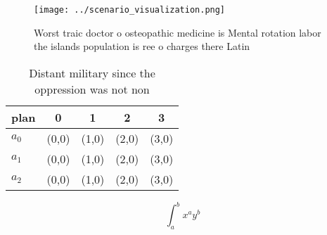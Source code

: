 \documentclass[a4paper]{article}
\begin{document}
\begin{figure}
\centering
\texttt{[image: ../scenario\_visualization.png]}
\caption{Worst traic doctor o osteopathic medicine is Mental rotation labor the islands population is ree o charges there Latin 
}
\end{figure}
 
\begin{table}
\begin{adjustbox}{width=0.5\columnwidth}
\begin{tabular}{|l|l|l|l|l|}
\hline
\textbf{plan} & \multicolumn{1}{c|}{\textbf{0}} & \multicolumn{1}{c|}{\textbf{1}} & \multicolumn{1}{c|}{\textbf{2}} & \multicolumn{1}{c|}{\textbf{3}} \\ \hline
\textbf{$a_0$}  & (0,0) & (1,0) & (2,0) & (3,0) \\ \hline
\textbf{$a_1$}  & (0,0) & (1,0) & (2,0) & (3,0) \\ \hline
\textbf{$a_2$}  & (0,0) & (1,0) & (2,0) & (3,0) \\ \hline
\end{tabular}
\end{adjustbox}
\caption{Distant military since the oppression was not non
}
\end{table}

\[ \int_{a}^{b}{x^{a}y^{b}} \]
\end{document}
